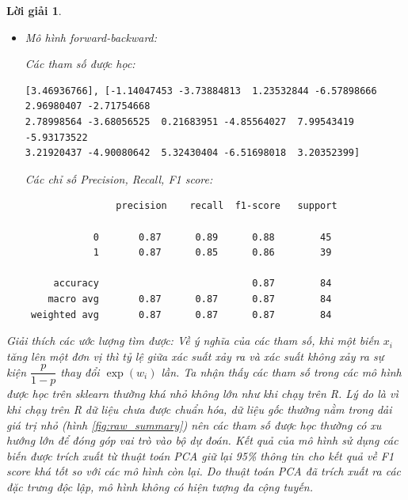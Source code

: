 \documentclass[14pt, a4paper]{article}
\theoremstyle{sltheorem}
\theoremstyle{soltheorem}
\newtheorem*{loigiai}{Lời giải}
\begin{document}
\begin{loigiai}
\begin{itemize}
        Các chỉ số Precision, Recall, F1 score:

        \begin{verbatim}
                precision    recall  f1-score   support

            0       0.95      0.80      0.87        45
            1       0.80      0.95      0.87        39
 
     accuracy                           0.87        84
    macro avg       0.88      0.87      0.87        84
 weighted avg       0.88      0.87      0.87        84
        \end{verbatim}

        \item Mô hình forward-backward:
        
        Các tham số được học:

        \begin{verbatim}
[3.46936766], [-1.14047453 -3.73884813  1.23532844 -6.57898666  2.96980407 -2.71754668
2.78998564 -3.68056525  0.21683951 -4.85564027  7.99543419 -5.93173522
3.21920437 -4.90080642  5.32430404 -6.51698018  3.20352399]
        \end{verbatim}

        Các chỉ số Precision, Recall, F1 score:

        \begin{verbatim}
                precision    recall  f1-score   support

            0       0.87      0.89      0.88        45
            1       0.87      0.85      0.86        39
 
     accuracy                           0.87        84
    macro avg       0.87      0.87      0.87        84
 weighted avg       0.87      0.87      0.87        84
        \end{verbatim}
    \end{itemize}

    Giải thích các ước lượng tìm được: Về ý nghĩa của các tham số, khi một biến $x_i$ tăng lên một đơn vị thì tỷ lệ giữa xác suất xảy ra và xác suất không xảy ra sự kiện $\dfrac{p}{1 - p}$ thay đổi $\exp(w_i)$ lần.
    Ta nhận thấy các tham số trong các mô hình được học trên sklearn thường khá nhỏ không lớn như khi chạy trên R.
    Lý do là vì khi chạy trên R dữ liệu chưa được chuẩn hóa, dữ liệu gốc thường nằm trong dải giá trị nhỏ (hình \ref{fig:raw_summary}) nên các tham số được học thường có xu hướng lớn để đóng góp vai trò vào bộ dự đoán.
    Kết quả của mô hình sử dụng các biến được trích xuất từ thuật toán PCA giữ lại 95\% thông tin cho kết quả về F1 score khá tốt so với các mô hình còn lại.
    Do thuật toán PCA đã trích xuất ra các đặc trưng độc lập, mô hình không có hiện tượng đa cộng tuyến.
\end{loigiai}
\end{document}
